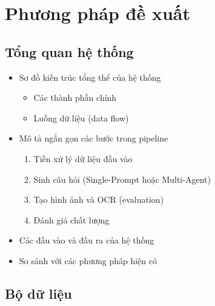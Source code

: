 
\chapter{Phương pháp đề xuất}

\section{Tổng quan hệ thống}
\begin{itemize}
    \item Sơ đồ kiến trúc tổng thể của hệ thống
    \begin{itemize}
        \item Các thành phần chính
        \item Luồng dữ liệu (data flow)
    \end{itemize}
    \item Mô tả ngắn gọn các bước trong pipeline
    \begin{enumerate}
        \item Tiền xử lý dữ liệu đầu vào
        \item Sinh câu hỏi (Single-Prompt hoặc Multi-Agent)
        \item Tạo hình ảnh và OCR (evaluation)
        \item Đánh giá chất lượng
    \end{enumerate}
    \item Các đầu vào và đầu ra của hệ thống
    \item So sánh với các phương pháp hiện có
\end{itemize}

\section{Bộ dữ liệu}

